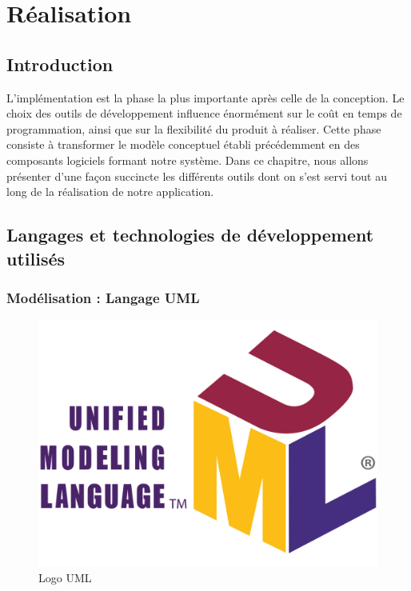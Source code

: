 \chapter{Réalisation}
\label{chap:Réalisation}

\section*{Introduction}

L’implémentation est la phase la plus importante après celle de la conception. Le choix
des outils de développement influence énormément sur le coût en temps de programmation, ainsi que sur la flexibilité du produit à réaliser. Cette phase consiste à transformer
le modèle conceptuel établi précédemment en des composants logiciels formant notre système. Dans ce chapitre, nous allons présenter d’une façon succincte les différents outils
dont on s’est servi tout au long de la réalisation de notre application.
\pagebreak
\section{Langages et technologies de développement utilisés}


\subsection{Modélisation : Langage UML}

\begin{figure}[H]
    \centering
    \includegraphics[scale=0.15]{Logos/UML_logo.png}
    \caption{Logo UML}
\end{figure}

